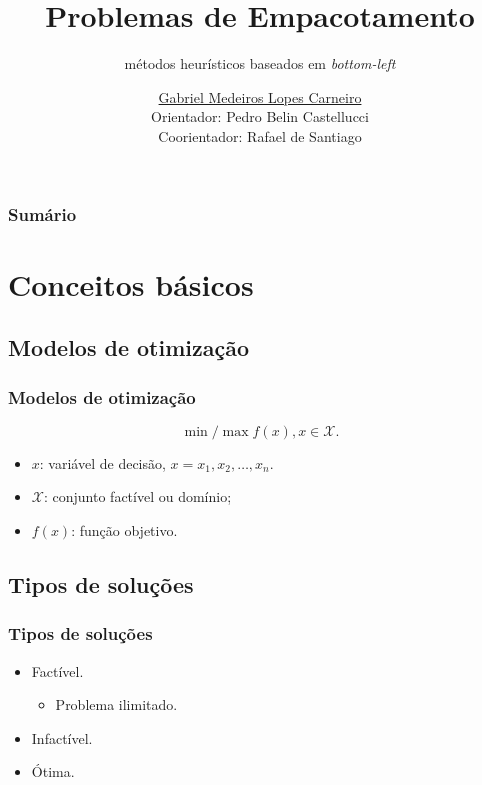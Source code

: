 \documentclass[12pt]{beamer}
\title{Problemas de Empacotamento}
\subtitle{métodos heurísticos baseados em \textit{bottom-left}}
\author[\href{https://github.com/G-Carneiro}{Gabriel Carneiro}]{
    \href{https://github.com/G-Carneiro}{Gabriel Medeiros Lopes Carneiro} \\
    Orientador: Pedro Belin Castellucci \\
    Coorientador: Rafael de Santiago
}
\institute[UFSC]{Universidade Federal de Santa Catarina}
\begin{document}
    \begin{frame}[plain]
        \titlepage
    \end{frame}

    \begin{frame}
        \frametitle{Sumário}
        \tableofcontents
    \end{frame}


    \section{Conceitos básicos}\label{sec:introducao}

    \subsection{Modelos de otimização}\label{subsec:modelos-de-otimizacao}
    \begin{frame}
        \frametitle{Modelos de otimização}
        \[
            \min\!/\!\max f(x), x \in \mathcal{X}.
        \]
        \begin{itemize}
            \item $x$: variável de decisão, $x = x_1, x_2, \dots, x_n$.
            \item $\mathcal{X}$: conjunto factível ou domínio;
            \item $f(x)$: função objetivo.
        \end{itemize}
    \end{frame}

    \subsection{Tipos de soluções}\label{subsec:tipos-de-solucoes}
    \begin{frame}
        \frametitle{Tipos de soluções}
        \begin{itemize}
            \item Factível.
            \begin{itemize}
                \item Problema ilimitado.
            \end{itemize}
            \item Infactível.
            \item Ótima.
        \end{itemize}
    \end{frame}
\end{document}
